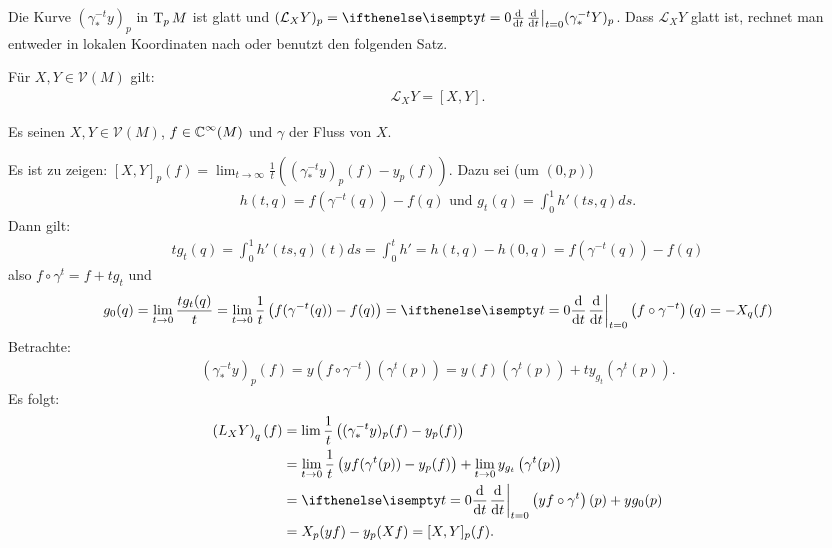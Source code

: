 Die Kurve $(\gamma_{*}^{-t}y)_p$ in $\operatorname{T}_pM$ ist glatt und $(\mathcal L_XY)_p = \difffrac[t=0]{}{t}(\gamma_{*}^{-t}Y)_p$. Dass $\mathcal L_XY$ glatt ist, rechnet man entweder in lokalen Koordinaten nach oder benutzt den folgenden Satz.

\begin{Satz}
  Für $X,Y \in \mathcal V(M)$ gilt:
  \begin{align*}
    \mathcal L_XY = [X,Y].
  \end{align*}
\end{Satz}

\begin{bew}
Es seinen $X,Y \in \mathcal V(M)$, $f \in \operatorname{\mathbb{C}}^{\infty}(M)$ und $\gamma$ der Fluss von $X$.

Es ist zu zeigen: $[X,Y]_p(f) = \lim_{t \to \infty} \frac{1}{t}\left((\gamma_{*}^{-t}y)_p(f)-y_p(f)\right)$.
Dazu sei (um $(0,p)$)
\begin{align*}
  h(t,q) = f(\gamma^{-t}(q))-f(q) \text{ und } g_t(q) = \int_0^1 h'(ts,q)ds.
\end{align*}
Dann gilt:
\begin{align*}
  tg_t(q) = \int_0^1h'(ts,q)(t)ds = \int_0^th' = h(t,q) - h(0,q) = f(\gamma^{-t}(q)) - f(q)
\end{align*}
also $f \circ \gamma^t = f + tg_t$ und 
\begin{align*}
  g_0(q) = \lim_{t \to 0} \frac{tg_t(q)}{t} = \lim_{t \to 0}\frac{1}t\left(f(\gamma^{-t}(q))-f(q)\right) = \difffrac[t=0]{}{t}\left(f \circ \gamma^{-t}\right)(q) = -X_q(f)
\end{align*}
Betrachte:
\begin{align*}
  \left(\gamma_{*}^{-t}y\right)_p(f) = y\left(f \circ \gamma^{-t}\right)\left(\gamma^t(p)\right) = y(f)\left(\gamma^t(p)\right) + ty_{g_t}\left(\gamma^t(p)\right).
\end{align*}
Es folgt:
\begin{align*}
  \left(L_XY\right)_q(f) & = \lim \frac{1}t \left((\gamma_{*}^{-t}y)_p(f) - y_p(f)\right)\\
& = \lim_{t\to 0} \frac{1}t \left(yf(\gamma^t(p))-y_p(f)\right) + \lim_{t\to 0} y_{g_t}\left(\gamma^t(p)\right)\\
& = \difffrac[t=0]{}{t}\left(yf \circ \gamma^t\right)(p) + yg_0(p)\\
& = X_p(yf) - y_p(Xf) = [X,Y]_p(f).
\end{align*} 
\end{bew}


